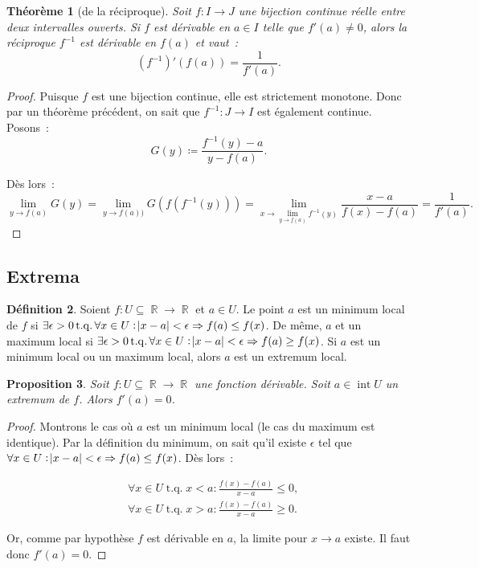 \documentclass{article}
\DeclareMathOperator{\intr}{int}
\DeclareMathOperator{\R}{\mathbb R}
\DeclareMathOperator{\tq}{ t.q. }
\newtheorem{thm}{Théorème}[section]
\newtheorem{prp}[thm]{Proposition}
\theoremstyle{definition}
\newtheorem{déf}[thm]{Définition}
\theoremstyle{remark}
\begin{document}
		\begin{thm}[de la réciproque] Soit $f : I \to J$ une bijection continue réelle entre deux intervalles ouverts. Si $f$ est dérivable en $a \in I$ telle
		que $f'(a) \neq 0$, alors la réciproque $f^{-1}$ est dérivable en $f(a)$ et vaut~:
		\[\left(f^{-1}\right)'(f(a)) = \frac 1{f'(a)}.\]
		\end{thm}

		\begin{proof} Puisque $f$ est une bijection continue, elle est strictement monotone. Donc par un théorème précédent, on sait que $f^{-1} : J \to I$
		est également continue. Posons~:
		\[G(y) \coloneqq \frac {f^{-1}(y) - a}{y - f(a)}.\]

		Dès lors~:
		\[\lim_{y \to f(a)} G(y) = \lim_{y \to f(a))}G(f(f^{-1}(y))) = \lim_{x \to \lim_{y \to f(a)}f^{-1}(y)}\frac {x-a}{f(x)-f(a)} = \frac 1{f'(a)}.\]
		\end{proof}

	\subsection{Extrema}

		\begin{déf} Soient $f : U \subseteq \R \to \R$ et $a \in U$. Le point $a$ est un minimum local de $f$ si
		$\exists \epsilon > 0 \tq \forall x \in U : \abs{x-a} < \epsilon \Rightarrow f(a) \leq f(x)$. De même, $a$ et un maximum local si
		$\exists \epsilon > 0 \tq \forall x \in U : \abs{x-a} < \epsilon \Rightarrow f(a) \geq f(x)$. Si $a$ est un minimum local ou un maximum local, alors $a$ est
		un extremum local. \end{déf}

		\begin{prp} Soit $f : U \subseteq \R \to \R$ une fonction dérivable. Soit $a \in \intr U$ un extremum de $f$. Alors $f'(a) = 0$. \end{prp}

		\begin{proof} Montrons le cas où $a$ est un minimum local (le cas du maximum est identique). Par la définition du minimum, on sait qu'il existe
		$\epsilon$ tel que $\forall x \in U : \abs{x-a} < \epsilon \Rightarrow f(a) \leq f(x)$. Dès lors~:

		\begin{align*}
			&\forall x \in U \tq x < a : \frac {f(x)-f(a)}{x-a} \leq 0, \\
			&\forall x \in U \tq x > a : \frac {f(x)-f(a)}{x-a} \geq 0.
		\end{align*}

		Or, comme par hypothèse $f$ est dérivable en $a$, la limite pour $x \to a$ existe. Il faut donc $f'(a) = 0$. \end{proof}
\end{document}
